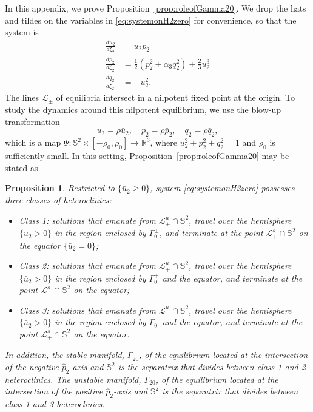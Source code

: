 \documentclass[11pt]{article}
\numberwithin{equation}{section}
\newtheorem{proposition}{Proposition}[section]
\begin{document}
In this appendix, we prove Proposition~\ref{prop:roleofGamma20}.
We drop the hats and tildes on the variables in \eqref{eq:systemonH2zero} for convenience, so that the system is
\begin{equation}\label{eq:appD}
    \begin{split}
        \frac{du_2}{d\xi_2} &= u_2 p_2 \\
        \frac{dp_2}{d\xi_2} &= \tfrac12 \left( p_2^2 + \alpha_3 q_2^2\right) + \tfrac23 u_2^3 \\
        \frac{dq_2}{d\xi_2} &= -u_2^2.
    \end{split}
\end{equation}
%
The lines $\mathcal L_{\pm}$ of equilibria intersect in a nilpotent fixed point at the origin. 
To study the dynamics around this nilpotent equilibrium, we use the blow-up transformation
%
\begin{equation}\label{eq:appDdesing}
u_2 = \rho \bar{u}_2, \quad
p_2 = \rho \bar{p}_2, \quad 
q_2 = \rho \bar{q}_2,
\end{equation}
%
which is a map $\Psi: \mathbb S^2 \times [-\rho_0,\rho_0] \to \mathbb R^3$, where $\overline u_2^2 + \overline p_2^2 + \overline q_2^2 = 1$ and $\rho_0$ is sufficiently small. 
In this setting, Proposition~\ref{prop:roleofGamma20} may be stated as 
%
\begin{proposition}\label{prop:roleofGamma20appendix}
Restricted to $\{ \bar{u}_2  \ge 0 \}$, system \eqref{eq:systemonH2zero} possesses three classes of heteroclinics:
\begin{itemize}
    \item Class 1: solutions that emanate from $\mathcal{L}_+^u \cap \mathbb{S}^2$, travel over the hemisphere $\{ \bar{u}_2 > 0 \}$ in the region enclosed by $\Gamma_0^\pm$, and terminate at the point $\mathcal{L}_+^s \cap \mathbb{S}^2$ on the equator $\{ \bar{u}_2=0 \}$;
     \item Class 2: solutions that emanate from $\mathcal{L}_+^u \cap \mathbb{S}^2$, travel over the hemisphere $\{ \bar{u}_2 > 0 \}$ in the region enclosed by $\Gamma_0^+$ and the equator, and terminate at the point $\mathcal{L}_-^s \cap \mathbb{S}^2$ on the equator;
     \item Class 3: solutions that emanate from $\mathcal{L}_-^u \cap \mathbb{S}^2$, travel over the hemisphere $\{ \bar{u}_2 > 0 \}$ in the region enclosed by $\Gamma_0^-$ and the equator, and terminate at the point $\mathcal{L}_+^s \cap \mathbb{S}^2$ on the equator.
     \end{itemize}
     \noindent 
In addition, the stable manifold, $\Gamma_{20}^+$, of the equilibrium located at the intersection of the negative $\hat{p}_2$-axis and $\mathbb{S}^2$ is the separatrix that divides between class 1 and 2 heteroclinics.
The unstable manifold, $\Gamma_{20}^-$, of the equilibrium located at the intersection of the positive $\hat{p}_2$-axis and $\mathbb{S}^2$ is the separatrix that divides between class 1 and 3 heteroclinics.
\end{proposition}
\end{document}
